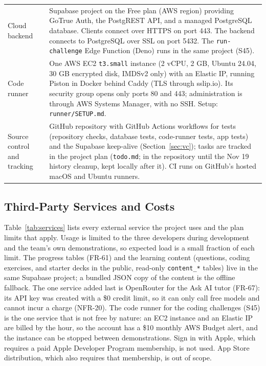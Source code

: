 \documentclass[12pt,letterpaper]{article}
\begin{document}
\begin{table}[H]
\begin{tabularx}{\textwidth}{@{}L{3.3cm} Y@{}}
Cloud backend & Supabase project on the Free plan (AWS region) providing GoTrue Auth, the PostgREST API, and a managed PostgreSQL database. Clients connect over HTTPS on port 443. The backend connects to PostgreSQL over SSL on port 5432. The \texttt{run-challenge} Edge Function (Deno) runs in the same project (S45). \\
Code runner & One AWS EC2 \texttt{t3.small} instance (2 vCPU, 2 GB, Ubuntu 24.04, 30 GB encrypted disk, IMDSv2 only) with an Elastic IP, running Piston in Docker behind Caddy (TLS through sslip.io). Its security group opens only ports 80 and 443; administration is through AWS Systems Manager, with no SSH. Setup: \texttt{runner/SETUP.md}. \\
Source control and tracking & GitHub repository with GitHub Actions workflows for tests (repository checks, database tests, code-runner tests, app tests) and the Supabase keep-alive (Section~\ref{sec:vc}); tasks are tracked in the project plan (\texttt{todo.md}; in the repository until the Nov 19 history cleanup, kept locally after it). CI runs on GitHub's hosted macOS and Ubuntu runners. \\
\bottomrule
\end{tabularx}
\end{table}

\subsection{Third-Party Services and Costs}
Table~\ref{tab:services} lists every external service the project uses and the plan
limits that apply. Usage is limited to the three developers during development and
the team's own demonstrations, so expected load is a small fraction of each limit.
The progress tables (FR-61) and the learning content (questions, coding exercises,
and starter decks in the public, read-only \texttt{content\_*} tables) live in the same
Supabase project; a bundled JSON copy of the content is the offline fallback. The one service added last is
OpenRouter for the Ask AI tutor (FR-67): its API key was created with a \$0 credit
limit, so it can only call free models and cannot incur a charge (NFR-20).
The code runner for the coding challenges (S45) is the one service that is not
free by nature: an EC2 instance and an Elastic IP are billed by the hour, so the
account has a \$10 monthly AWS Budget alert, and the instance can be stopped
between demonstrations. Sign in with Apple, which requires a paid Apple Developer Program membership, is not
used. App Store distribution, which also requires that membership, is out of scope.
\end{document}

